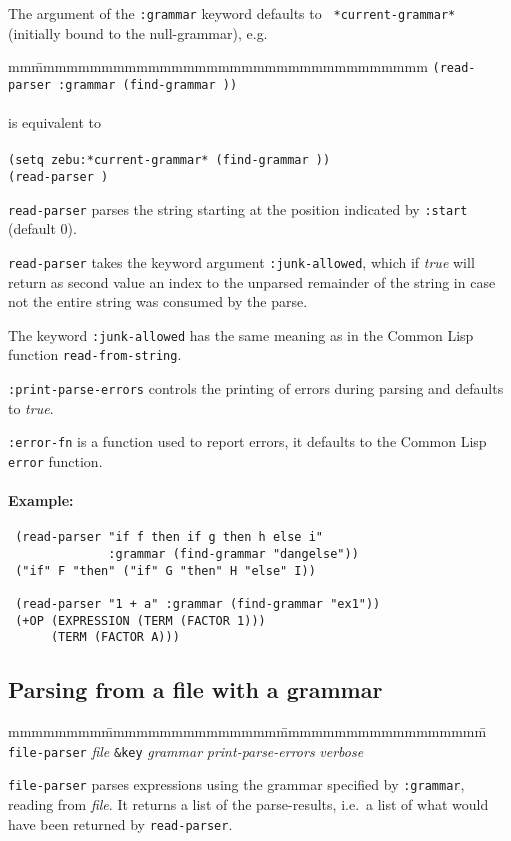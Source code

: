 The argument of the {\tt :grammar} keyword defaults to {\tt
*current-grammar*} (initially bound to the null-grammar),
e.g.

\begin{tabbing}
mm\=mmmmmmmmmmmmmmmmmmmmmmmmmmmmmmmmmm\kill
\> {\tt (read-parser  :grammar (find-grammar ))} \\
\\
\> is equivalent to\\
\\
\> {\tt (setq zebu:*current-grammar* (find-grammar ))} \\
\> {\tt (read-parser )}
\end{tabbing}


{\tt read-parser} parses the string starting at the position indicated
by {\tt :start} (default 0).

{\tt read-parser} takes the keyword argument {\tt :junk-allowed},
which if {\em true} will return as second value an index to the
unparsed remainder of the string in case not the entire string was
consumed by the parse.

The keyword {\tt :junk-allowed} has the same meaning as in the {\sf
Common Lisp} function {\tt read-from-string}.

{\tt :print-parse-errors} controls the printing of errors during
parsing and defaults to {\em true}.

{\tt :error-fn} is a function used to report errors, it defaults to
the {\sf Common Lisp} {\tt error} function.

\paragraph{Example:}

\begin{verbatim}
 (read-parser "if f then if g then h else i" 
              :grammar (find-grammar "dangelse"))
 ("if" F "then" ("if" G "then" H "else" I))

 (read-parser "1 + a" :grammar (find-grammar "ex1"))
 (+OP (EXPRESSION (TERM (FACTOR 1)))
      (TERM (FACTOR A)))
\end{verbatim}

\subsection{Parsing from a file with a grammar}
{\samepage
\begin{tabbing}
mmmmmmmm\=mmmmmmmmmmmmmmm\=mmmmmmmmmmmmmmmmmm\=\kill
{\tt file-parser} {\em file} {\tt \&key} {\em grammar} {\em print-parse-errors} {\em verbose} \>\> 
\end{tabbing}

{\tt file-parser} parses expressions using the
grammar specified by {\tt :grammar}, reading from {\em file}.  It
returns a list of the parse-results, i.e.\ a list of what would have
been returned by {\tt read-parser}.  }

